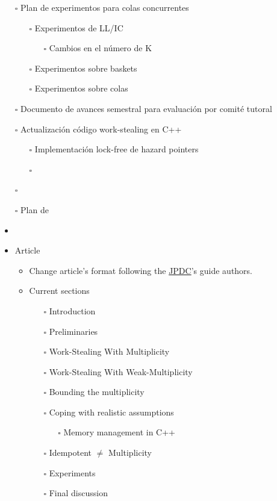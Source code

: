 \documentclass[openany, a4paper]{book}
\theoremstyle{plain}
\theoremstyle{definition}
\theoremstyle{remark}
\begin{document}
\begin{itemize}
\item[{$\square$}] Plan de experimentos para colas concurrentes
\begin{itemize}
\item[{$\square$}] Experimentos de LL/IC
\begin{itemize}
\item[{$\square$}] Cambios en el número de K
\end{itemize}
\item[{$\square$}] Experimentos sobre baskets
\item[{$\square$}] Experimentos sobre colas
\end{itemize}
\item[{$\square$}] Documento de avances semestral para evaluación por comité tutoral
\item[{$\square$}] Actualización código work-stealing en C++
\begin{itemize}
\item[{$\square$}] Implementación lock-free de hazard pointers
\item[{$\square$}]
\end{itemize}
\item[{$\square$}]

\item[{$\square$}] Plan de
\item
\end{itemize}
\begin{itemize}
\item Article
\begin{itemize}
\item Change article's format following the \href{https://www.elsevier.com/journals/journal-of-parallel-and-distributed-computing/0743-7315/guide-for-authors}{JPDC}'s guide authors.
\item Current sections
\begin{itemize}
\item[{$\square$}] Introduction
\item[{$\square$}] Preliminaries
\item[{$\square$}] Work-Stealing With Multiplicity
\item[{$\square$}] Work-Stealing With Weak-Multiplicity
\item[{$\square$}] Bounding the multiplicity
\item[{$\square$}] Coping with realistic assumptions
\begin{itemize}
\item[{$\square$}] Memory management in C++
\end{itemize}
\item[{$\square$}] Idempotent \(\neq\) Multiplicity
\item[{$\square$}] Experiments
\item[{$\square$}] Final discussion
\end{itemize}
\end{itemize}
\end{itemize}
\end{document}
